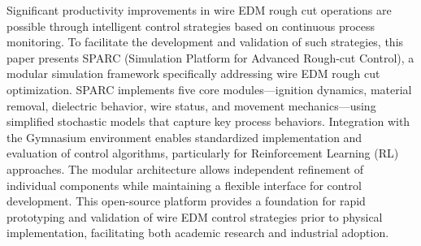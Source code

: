 \documentclass[5p,times,procedia]{elsarticle}
\begin{document}
Significant productivity improvements in wire EDM rough cut operations are possible through intelligent control strategies based on continuous process monitoring. To facilitate the development and validation of such strategies, this paper presents SPARC (Simulation Platform for Advanced Rough-cut Control), a modular simulation framework specifically addressing wire EDM rough cut optimization. SPARC implements five core modules—ignition dynamics, material removal, dielectric behavior, wire status, and movement mechanics—using simplified stochastic models that capture key process behaviors. Integration with the Gymnasium \cite{towers2024gymnasium} environment enables standardized implementation and evaluation of control algorithms, particularly for Reinforcement Learning (RL) approaches. The modular architecture allows independent refinement of individual components while maintaining a flexible interface for control development. This open-source platform provides a foundation for rapid prototyping and validation of wire EDM control strategies prior to physical implementation, facilitating both academic research and industrial adoption.
\end{document}
